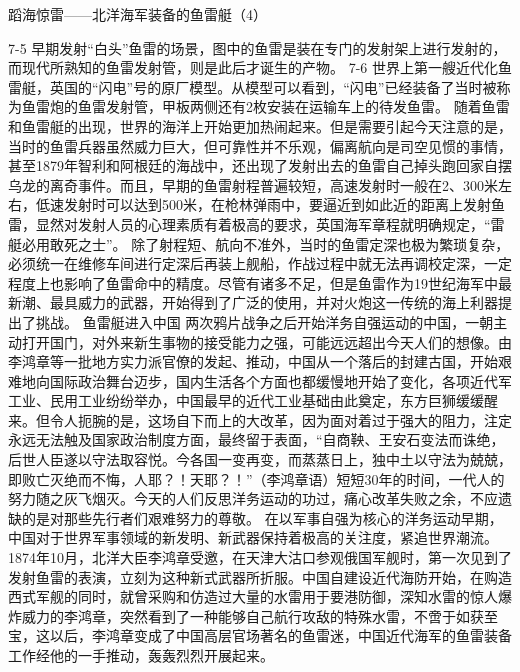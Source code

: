 \documentclass[12pt,UTF8]{ctexbook}
\begin{document}
蹈海惊雷——北洋海军装备的鱼雷艇（4）

7-5
早期发射“白头”鱼雷的场景，图中的鱼雷是装在专门的发射架上进行发射的，而现代所熟知的鱼雷发射管，则是此后才诞生的产物。
7-6
世界上第一艘近代化鱼雷艇，英国的“闪电”号的原厂模型。从模型可以看到，“闪电”已经装备了当时被称为鱼雷炮的鱼雷发射管，甲板两侧还有2枚安装在运输车上的待发鱼雷。
随着鱼雷和鱼雷艇的出现，世界的海洋上开始更加热闹起来。但是需要引起今天注意的是，当时的鱼雷兵器虽然威力巨大，但可靠性并不乐观，偏离航向是司空见惯的事情，甚至1879年智利和阿根廷的海战中，还出现了发射出去的鱼雷自己掉头跑回家自摆乌龙的离奇事件。而且，早期的鱼雷射程普遍较短，高速发射时一般在2、300米左右，低速发射时可以达到500米，在枪林弹雨中，要逼近到如此近的距离上发射鱼雷，显然对发射人员的心理素质有着极高的要求，英国海军章程就明确规定，“雷艇必用敢死之士”。 除了射程短、航向不准外，当时的鱼雷定深也极为繁琐复杂，必须统一在维修车间进行定深后再装上舰船，作战过程中就无法再调校定深，一定程度上也影响了鱼雷命中的精度。尽管有诸多不足，但是鱼雷作为19世纪海军中最新潮、最具威力的武器，开始得到了广泛的使用，并对火炮这一传统的海上利器提出了挑战。
鱼雷艇进入中国
两次鸦片战争之后开始洋务自强运动的中国，一朝主动打开国门，对外来新生事物的接受能力之强，可能远远超出今天人们的想像。由李鸿章等一批地方实力派官僚的发起、推动，中国从一个落后的封建古国，开始艰难地向国际政治舞台迈步，国内生活各个方面也都缓慢地开始了变化，各项近代军工业、民用工业纷纷举办，中国最早的近代工业基础由此奠定，东方巨狮缓缓醒来。但令人扼腕的是，这场自下而上的大改革，因为面对着过于强大的阻力，注定永远无法触及国家政治制度方面，最终留于表面，“自商鞅、王安石变法而诛绝，后世人臣遂以守法取容悦。今各国一变再变，而蒸蒸日上，独中土以守法为兢兢，即败亡灭绝而不悔，人耶？！天耶？！”（李鸿章语）短短30年的时间，一代人的努力随之灰飞烟灭。今天的人们反思洋务运动的功过，痛心改革失败之余，不应遗缺的是对那些先行者们艰难努力的尊敬。
在以军事自强为核心的洋务运动早期，中国对于世界军事领域的新发明、新武器保持着极高的关注度，紧追世界潮流。1874年10月，北洋大臣李鸿章受邀，在天津大沽口参观俄国军舰时，第一次见到了发射鱼雷的表演，立刻为这种新式武器所折服。中国自建设近代海防开始，在购造西式军舰的同时，就曾采购和仿造过大量的水雷用于要港防御，深知水雷的惊人爆炸威力的李鸿章，突然看到了一种能够自己航行攻敌的特殊水雷，不啻于如获至宝，这以后，李鸿章变成了中国高层官场著名的鱼雷迷，中国近代海军的鱼雷装备工作经他的一手推动，轰轰烈烈开展起来。
\end{document}
